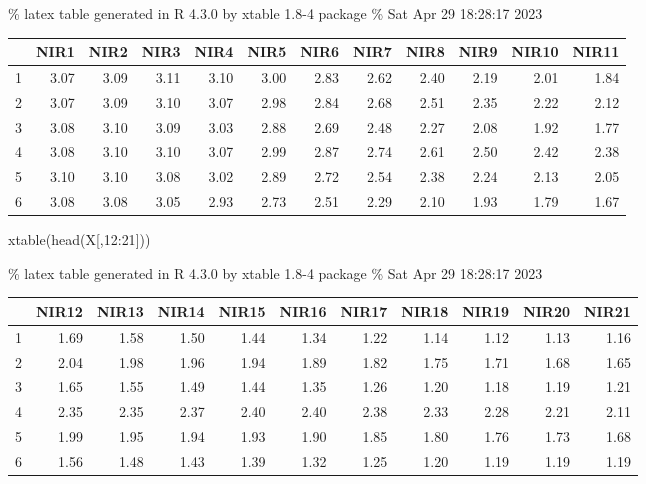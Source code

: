 \documentclass[
]{article}
\newenvironment{Shaded}{\begin{snugshade}}{\end{snugshade}}
\newcommand{\DecValTok}[1]{\textcolor[rgb]{0.00,0.00,0.81}{#1}}
\newcommand{\FunctionTok}[1]{\textcolor[rgb]{0.00,0.00,0.00}{#1}}
\newcommand{\NormalTok}[1]{#1}
\newcommand{\SpecialCharTok}[1]{\textcolor[rgb]{0.00,0.00,0.00}{#1}}
\begin{document}
\% latex table generated in R 4.3.0 by xtable 1.8-4 package \% Sat Apr
29 18:28:17 2023

\begin{table}[ht]
\centering
\begin{tabular}{rrrrrrrrrrrr}
  \hline
 & NIR1 & NIR2 & NIR3 & NIR4 & NIR5 & NIR6 & NIR7 & NIR8 & NIR9 & NIR10 & NIR11 \\ 
  \hline
1 & 3.07 & 3.09 & 3.11 & 3.10 & 3.00 & 2.83 & 2.62 & 2.40 & 2.19 & 2.01 & 1.84 \\ 
  2 & 3.07 & 3.09 & 3.10 & 3.07 & 2.98 & 2.84 & 2.68 & 2.51 & 2.35 & 2.22 & 2.12 \\ 
  3 & 3.08 & 3.10 & 3.09 & 3.03 & 2.88 & 2.69 & 2.48 & 2.27 & 2.08 & 1.92 & 1.77 \\ 
  4 & 3.08 & 3.10 & 3.10 & 3.07 & 2.99 & 2.87 & 2.74 & 2.61 & 2.50 & 2.42 & 2.38 \\ 
  5 & 3.10 & 3.10 & 3.08 & 3.02 & 2.89 & 2.72 & 2.54 & 2.38 & 2.24 & 2.13 & 2.05 \\ 
  6 & 3.08 & 3.08 & 3.05 & 2.93 & 2.73 & 2.51 & 2.29 & 2.10 & 1.93 & 1.79 & 1.67 \\ 
   \hline
\end{tabular}
\end{table}

\begin{Shaded}
\begin{Highlighting}[]
\FunctionTok{xtable}\NormalTok{(}\FunctionTok{head}\NormalTok{(X[,}\DecValTok{12}\SpecialCharTok{:}\DecValTok{21}\NormalTok{]))}
\end{Highlighting}
\end{Shaded}

\% latex table generated in R 4.3.0 by xtable 1.8-4 package \% Sat Apr
29 18:28:17 2023

\begin{table}[ht]
\centering
\begin{tabular}{rrrrrrrrrrr}
  \hline
 & NIR12 & NIR13 & NIR14 & NIR15 & NIR16 & NIR17 & NIR18 & NIR19 & NIR20 & NIR21 \\ 
  \hline
1 & 1.69 & 1.58 & 1.50 & 1.44 & 1.34 & 1.22 & 1.14 & 1.12 & 1.13 & 1.16 \\ 
  2 & 2.04 & 1.98 & 1.96 & 1.94 & 1.89 & 1.82 & 1.75 & 1.71 & 1.68 & 1.65 \\ 
  3 & 1.65 & 1.55 & 1.49 & 1.44 & 1.35 & 1.26 & 1.20 & 1.18 & 1.19 & 1.21 \\ 
  4 & 2.35 & 2.35 & 2.37 & 2.40 & 2.40 & 2.38 & 2.33 & 2.28 & 2.21 & 2.11 \\ 
  5 & 1.99 & 1.95 & 1.94 & 1.93 & 1.90 & 1.85 & 1.80 & 1.76 & 1.73 & 1.68 \\ 
  6 & 1.56 & 1.48 & 1.43 & 1.39 & 1.32 & 1.25 & 1.20 & 1.19 & 1.19 & 1.19 \\ 
   \hline
\end{tabular}
\end{table}
\end{document}
